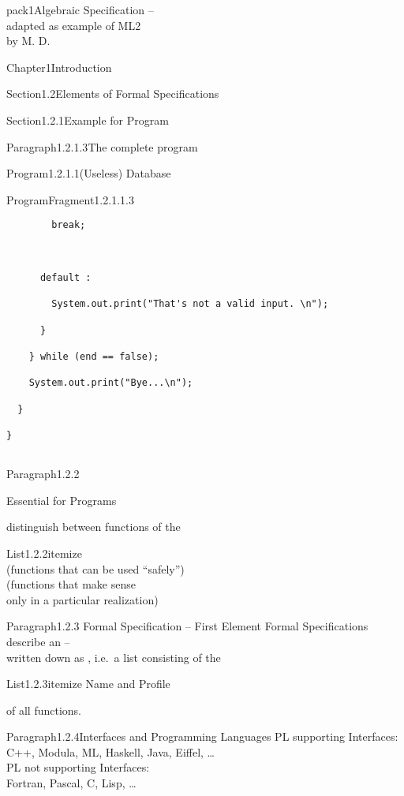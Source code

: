 \documentclass[landscape, slides, light]{mmiss2}
\begin{document}
\begin{Package}{pack1}{Algebraic
Specification -- \\ adapted as example of ML2\\ by M. D.}
\begin{Section}{Chapter1}{Introduction}
\begin{Section}{Section1.2}{Elements of Formal Specifications}{}
\begin{Section}{Section1.2.1}{Example for Program}{}
\begin{Paragraph}{Paragraph1.2.1.3}{The complete program}{}
\begin{Program}{Program1.2.1.1}{(Useless) Database}{}
\begin{ProgramFragment}{ProgramFragment1.2.1.1.3}{}{}
\begin{verbatim}
        break;



      default :

        System.out.print("That's not a valid input. \n");

      }

    } while (end == false);

    System.out.print("Bye...\n");

  }

}


\end{verbatim}
\normalsize
\end{ProgramFragment}
\end{Program}
\end{Paragraph}
\end{Section}

\begin{Paragraph}{Paragraph1.2.2}{}{}
\begin{center}
{\Large Essential for Programs}
\end{center}
distinguish between functions of the
\begin{List}{List1.2.2}{itemize}{}
\ListItem{}
{ \\ (functions that can be used
``safely'')}
\ListItem{}
{ \\ (functions that make sense \\
           only in a particular realization)}
\end{List}
\end{Paragraph}

\begin{Paragraph}{Paragraph1.2.3}{ Formal Specification -- First Element}{}
Formal Specifications describe an  -- \\
written down as , i.e.~a list consisting of the\\
\begin{List}{List1.2.3}{itemize}{}
\ListItem{}
{Name and}
\ListItem{}
{Profile}
\end{List}
of all functions.
\end{Paragraph}

\begin{Paragraph}{Paragraph1.2.4}{Interfaces and Programming Languages}{}
PL supporting Interfaces: \\
C++, Modula, ML, Haskell, Java, Eiffel, \dots \\ 
PL not supporting Interfaces: \\
Fortran, Pascal, C, Lisp, \dots
\end{Paragraph}


\end{Section}
\end{Section}
\end{Package}
\end{document}
